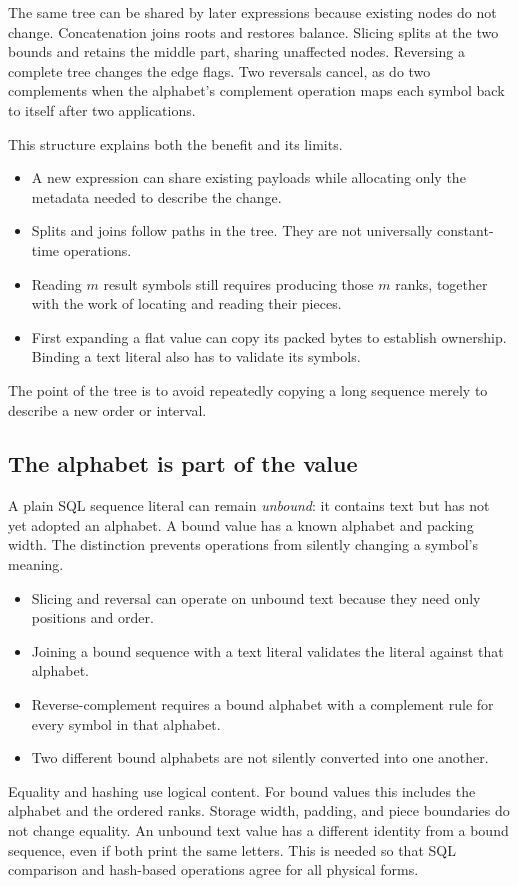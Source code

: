 The same tree can be shared by later expressions because existing nodes do
not change. Concatenation joins roots and restores balance. Slicing splits at
the two bounds and retains the middle part, sharing unaffected nodes.
Reversing a complete tree changes the edge flags. Two reversals cancel, as do
two complements when the alphabet's complement operation maps each symbol
back to itself after two applications.

This structure explains both the benefit and its limits.
\begin{itemize}
  \item A new expression can share existing payloads while allocating only
        the metadata needed to describe the change.
  \item Splits and joins follow paths in the tree. They are not universally
        constant-time operations.
  \item Reading \(m\) result symbols still requires producing those \(m\)
        ranks, together with the work of locating and reading their pieces.
  \item First expanding a flat value can copy its packed bytes to establish
        ownership. Binding a text literal also has to validate its symbols.
\end{itemize}
The point of the tree is to avoid repeatedly copying a long sequence merely
to describe a new order or interval.

\subsection{The alphabet is part of the value}

A plain SQL sequence literal can remain \emph{unbound}: it contains text but
has not yet adopted an alphabet. A bound value has a known alphabet and
packing width. The distinction prevents operations from silently changing a
symbol's meaning.
\begin{itemize}
  \item Slicing and reversal can operate on unbound text because they need
        only positions and order.
  \item Joining a bound sequence with a text literal validates the literal
        against that alphabet.
  \item Reverse-complement requires a bound alphabet with a complement rule
        for every symbol in that alphabet.
  \item Two different bound alphabets are not silently converted into one
        another.
\end{itemize}

Equality and hashing use logical content. For bound values this includes the
alphabet and the ordered ranks. Storage width, padding, and piece boundaries
do not change equality. An unbound text value has a different identity from a
bound sequence, even if both print the same letters. This is needed so that
SQL comparison and hash-based operations agree for all physical forms.
